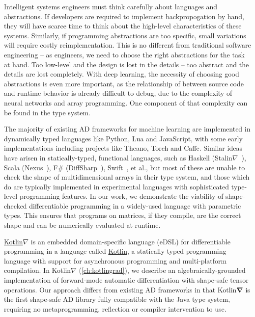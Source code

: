 \documentclass[12pt,initial,twoside,maitrise]{dms}
\numberwithin{equation}{section}
\numberwithin{table}{chapter}
\numberwithin{figure}{chapter}
\begin{document}
Intelligent systems engineers must think carefully about languages and abstractions. If developers are required to implement backpropogation by hand, they will have scarce time to think about the high-level characteristics of these systems. Similarly, if programming abstractions are too specific, small variations will require costly reimplementation. This is no different from traditional software engineering -- as engineers, we need to choose the right abstractions for the task at hand. Too low-level and the design is lost in the details -- too abstract and the details are lost completely. With deep learning, the necessity of choosing good abstractions is even more important, as the relationship of between source code and runtime behavior is already difficult to debug, due to the complexity of neural networks and array programming. One component of that complexity can be found in the type system.

The majority of existing AD frameworks for machine learning are implemented in dynamically typed languages like Python, Lua and JavaScript, with some early implementations including projects like Theano, Torch and Caffe. Similar ideas have arisen in statically-typed, functional languages, such as Haskell (Stalin$\nabla$~\citet{pearlmutter2008using}), Scala (Nexus~\citet{chen2017typesafe}), F\# (DiffSharp~\citet{baydin-diffsharp}), Swift~\citep{swift}, et al., but most of these are unable to check the shape of multidimensional arrays in their type system, and those which do are typically implemented in experimental languages with sophisticated type-level programming features. In our work, we demonstrate the viability of shape-checked differentiable programming in a widely-used language with parametric types. This ensures that programs on matrices, if they compile, are the correct shape and can be numerically evaluated at runtime.

\href{https://github.com/breandan/kotlingrad/}{Kotlin$\nabla$} is an embedded domain-specific language (eDSL) for differentiable programming in a language called \href{https://kotlinlang.org}{Kotlin}, a statically-typed programming language with support for asynchronous programming and multi-platform compilation. In Kotlin$\nabla$ (\autoref{ch:kotlingrad}), we describe an algebraically-grounded implementation of forward-mode automatic differentiation with shape-safe tensor operations. Our approach differs from existing AD frameworks in that Kotlin$\mathbf{\nabla}$ is the first shape-safe AD library fully compatible with the Java type system, requiring no metaprogramming, reflection or compiler intervention to use.
\end{document}
